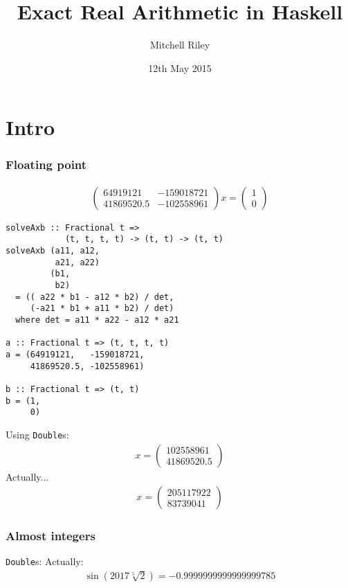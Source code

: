 \documentclass[11pt]{beamer}
\author{Mitchell Riley}
\title{Exact Real Arithmetic in Haskell}
\date{12th May 2015}
\begin{document}
\begin{frame}
\titlepage
\end{frame}

\section{Intro}

\begin{frame}
\frametitle{Floating point}
\begin{align*}
\begin{pmatrix}
64919121   & -159018721 \\
41869520.5 & -102558961
\end{pmatrix} x =
\begin{pmatrix}
1 \\
0
\end{pmatrix}
\end{align*}
\end{frame}

\begin{frame}[fragile]
\begin{verbatim}
solveAxb :: Fractional t =>
            (t, t, t, t) -> (t, t) -> (t, t)
solveAxb (a11, a12,
          a21, a22)
         (b1,
          b2)
  = (( a22 * b1 - a12 * b2) / det,
     (-a21 * b1 + a11 * b2) / det)
  where det = a11 * a22 - a12 * a21

a :: Fractional t => (t, t, t, t)
a = (64919121,   -159018721,
     41869520.5, -102558961)

b :: Fractional t => (t, t)
b = (1,
     0)
\end{verbatim}
\end{frame}

\begin{frame}
Using \texttt{Double}s:
\begin{align*}
x =
\begin{pmatrix}
102558961 \\
41869520.5
\end{pmatrix}
\end{align*}
\pause
Actually...
\begin{align*}
x =
\begin{pmatrix}
205117922 \\
83739041
\end{pmatrix}
\end{align*}
\end{frame}


\begin{frame}
\frametitle{Almost integers}
\texttt{Double}s:
\pause
Actually:
\begin{align*}
\sin(2017 \sqrt[5]{2}) = -0.9999999999999999785
\end{align*}
\end{frame}
\end{document}
